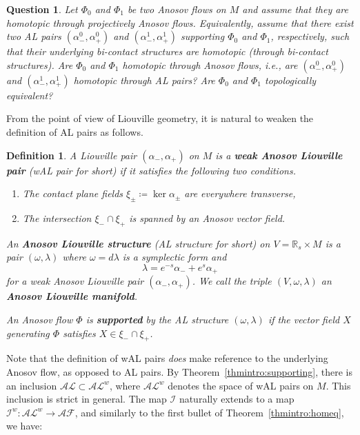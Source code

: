 \documentclass[letterpaper, 11pt]{article}
\numberwithin{equation}{section}
\newtheorem{question}{Question}
\newtheorem{defn}[thm]{Definition}
\newcommand{\R}{\mathbb{R}}
\begin{document}
\begin{question} Let $\Phi_0$ and $\Phi_1$ be two Anosov flows on $M$ and assume that they are homotopic through \emph{projectively} Anosov flows. Equivalently, assume that there exist two AL pairs $(\alpha_-^0, \alpha_+^0)$ and $(\alpha_-^1, \alpha_+^1)$ supporting $\Phi_0$ and $\Phi_1$, respectively, such that their underlying bi-contact structures are homotopic (through bi-contact structures). Are $\Phi_0$ and $\Phi_1$ homotopic through Anosov flows, i.e., are $(\alpha_-^0, \alpha_+^0)$ and $(\alpha_-^1, \alpha_+^1)$ homotopic through AL pairs? Are $\Phi_0$ and $\Phi_1$ topologically equivalent? 
\end{question}

\medskip

From the point of view of Liouville geometry, it is natural to weaken the definition of AL pairs as follows.

\begin{defn} A Liouville pair $(\alpha_-, \alpha_+)$ on $M$ is a \textbf{weak Anosov Liouville pair} (wAL pair for short) if it satisfies the following two conditions.
\begin{enumerate}[label=(\arabic*)]
	\item The contact plane fields $\xi_\pm \coloneqq \ker \alpha_\pm$ are everywhere transverse,
	\item The intersection $\xi_- \cap \xi_+$ is spanned by an Anosov vector field.
\end{enumerate}

An \textbf{Anosov Liouville structure} (AL structure for short) on $V=\R_s \times M$ is a pair $(\omega, \lambda)$ where $\omega = d \lambda$ is a symplectic form and $$\lambda =  e^{-s} \alpha_- + e^s \alpha_+$$ for a weak Anosov Liouville pair $(\alpha_-, \alpha_+)$.
We call the triple $(V, \omega, \lambda)$ an \textbf{Anosov Liouville manifold}.

An Anosov flow $\Phi$ is \textbf{supported} by the AL structure $(\omega, \lambda)$ if the vector field $X$ generating $\Phi$ satisfies $X \in \xi_- \cap \xi_+$.
\end{defn}

Note that the definition of wAL pairs \emph{does} make reference to the underlying Anosov flow, as opposed to AL pairs. By Theorem~\ref{thmintro:supporting}, there is an inclusion $\mathcal{AL} \subset \mathcal{AL}^w$, where $\mathcal{AL}^w$ denotes the space of wAL pairs on $M$. This inclusion is strict in general. The map $\mathcal{I}$ naturally extends to a map $\mathcal{I}^w : \mathcal{AL}^w \rightarrow \mathcal{AF}$, and similarly to the first bullet of Theorem~\ref{thmintro:homeq}, we have:
\end{document}
